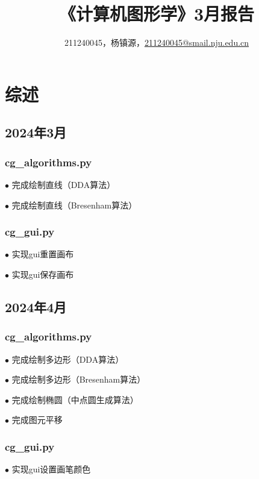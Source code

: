 \documentclass[a4paper,UTF8]{article}
\theoremstyle{definition}
\begin{document}
\title{\textbf{《计算机图形学》3月报告}}
\author{211240045，杨镇源，\href{mailto:211240045@smail.nju.edu.cn}{211240045@smail.nju.edu.cn}}
\maketitle

\section{综述}

\subsection{2024年3月}

\subsubsection{cg\_algorithms.py}

$\bullet$ 完成绘制直线（DDA算法）

$\bullet$ 完成绘制直线（Bresenham算法）

\subsubsection{cg\_gui.py}

$\bullet$ 实现gui重置画布

$\bullet$ 实现gui保存画布

\subsection{2024年4月}

\subsubsection{cg\_algorithms.py}

$\bullet$ 完成绘制多边形（DDA算法）

$\bullet$ 完成绘制多边形（Bresenham算法）

$\bullet$ 完成绘制椭圆（中点圆生成算法）

$\bullet$ 完成图元平移

\subsubsection{cg\_gui.py}

$\bullet$ 实现gui设置画笔颜色
\end{document}
